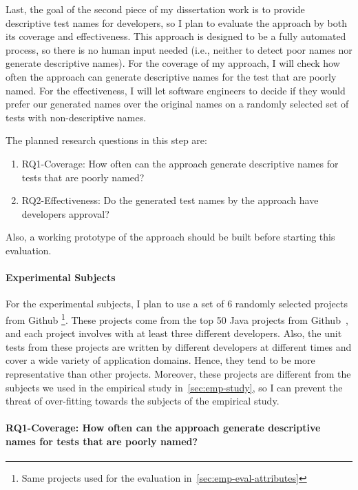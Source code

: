 Last, the goal of the second piece of my dissertation work is to provide descriptive test names for developers, so I plan to evaluate the approach by both its coverage and effectiveness.
%
This approach is designed to be a fully automated process, so there is no human input needed (i.e., neither to detect poor names nor generate descriptive names).
%
For the coverage of my approach, I will check how often the approach can generate descriptive names for the test that are poorly named.
%
For the effectiveness, I will let software engineers to decide if they would prefer our generated names over the original names on a randomly selected set of tests with non-descriptive names.


The planned research questions in this step are:
%
\begin{enumerate}
    \item RQ1-Coverage: How often can the approach generate descriptive names for tests that are poorly named?
    \item RQ2-Effectiveness: Do the generated test names by the approach have developers approval?
\end{enumerate}
%
Also, a working prototype of the approach should be built before starting this evaluation.

\paragraph{Experimental Subjects}

For the experimental subjects, I plan to use a set of \num{6} randomly selected projects from Github \footnote{Same projects used for the evaluation in~\cref{sec:emp-eval-attributes}}.
%
These projects come from the top \num{50} Java projects from Github~\cite{top50projects}, and each project involves with at least three different developers.
%
Also, the unit tests from these projects are written by different developers at different times and cover a wide variety of application domains.
%
Hence, they tend to be more representative than other projects.
%
Moreover, these projects are different from the subjects we used in the empirical study in~\cref{sec:emp-study}, so I can prevent the threat of over-fitting towards the subjects of the empirical study.


\paragraph{RQ1-Coverage: How often can the approach generate descriptive names for tests that are poorly named?}

